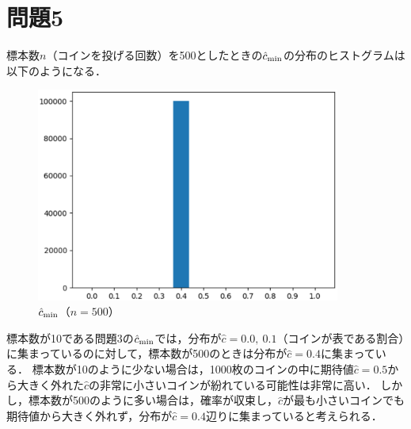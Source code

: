 \section*{問題5}
標本数$n$（コインを投げる回数）を500としたときの$\hat{c}_{\rm min}$の分布のヒストグラムは以下のようになる．
\begin{figure}[H]
    \begin{center}
        \includegraphics[width=100mm]{./figures/section_5/c_min_500.eps}
        \captionsetup{labelformat=empty,labelsep=none}
        \caption{$\hat{c}_{\rm min}$（$n=500$）}
    \end{center}
\end{figure}

標本数が10である問題3の$\hat{c}_{\rm min}$では，分布が$\hat{c}=0.0,\ 0.1$（コインが表である割合）に集まっているのに対して，標本数が500のときは分布が$\hat{c}=0.4$に集まっている．
標本数が10のように少ない場合は，1000枚のコインの中に期待値$\hat{c}=0.5$から大きく外れた$\hat{c}$の非常に小さいコインが紛れている可能性は非常に高い．
しかし，標本数が500のように多い場合は，確率が収束し，$\hat{c}$が最も小さいコインでも期待値から大きく外れず，分布が$\hat{c}=0.4$辺りに集まっていると考えられる．